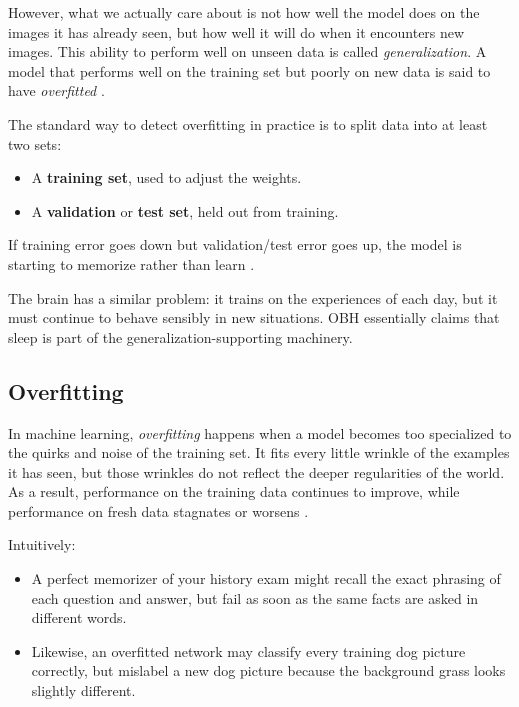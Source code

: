 However, what we actually care about is not how well the model does on the images it has already seen, but how well it will do when it encounters new images. This ability to perform well on unseen data is called \emph{generalization}. A model that performs well on the training set but poorly on new data is said to have \emph{overfitted} \citep{ibm_overfitting}.

The standard way to detect overfitting in practice is to split data into at least two sets:

\begin{itemize}
    \item A \textbf{training set}, used to adjust the weights.
    \item A \textbf{validation} or \textbf{test set}, held out from training.
\end{itemize}

If training error goes down but validation/test error goes up, the model is starting to memorize rather than learn \citep{aws_overfitting}.

The brain has a similar problem: it trains on the experiences of each day, but it must continue to behave sensibly in new situations. OBH essentially claims that sleep is part of the generalization-supporting machinery.


\subsection{Overfitting}\label{sec:ml_overfitting}

In machine learning, \emph{overfitting} happens when a model becomes too specialized to the quirks and noise of the training set. It fits every little wrinkle of the examples it has seen, but those wrinkles do not reflect the deeper regularities of the world. As a result, performance on the training data continues to improve, while performance on fresh data stagnates or worsens \citep{ibm_overfitting}.

Intuitively:

\begin{itemize}
    \item A perfect memorizer of your history exam might recall the exact phrasing of each question and answer, but fail as soon as the same facts are asked in different words.
    \item Likewise, an overfitted network may classify every training dog picture correctly, but mislabel a new dog picture because the background grass looks slightly different.
\end{itemize}

